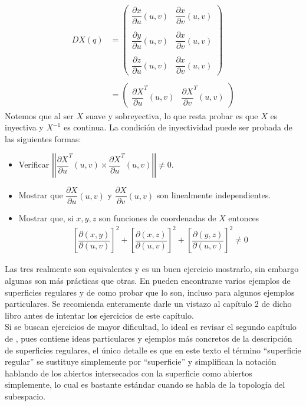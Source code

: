 \documentclass[oneside,11pt]{memoir}
\begin{document}
\begin{align*}
    DX(q)&=
    \begin{pmatrix}
        \dfrac{\partial x}{\partial u}(u,v)&\dfrac{\partial x}{\partial v}(u,v)\\
        \\
        \dfrac{\partial y}{\partial u}(u,v)&\dfrac{\partial x}{\partial v}(u,v)\\
        \\
        \dfrac{\partial z}{\partial u}(u,v)&\dfrac{\partial x}{\partial v}(u,v)
    \end{pmatrix}\\
    \\
    &=
    \begin{pmatrix}
        \dfrac{\partial X}{\partial u}^T(u,v)&\dfrac{\partial X}{\partial v}^T(u,v)
    \end{pmatrix}
\end{align*}
Notemos que al ser $X$ suave y sobreyectiva, lo que resta probar es que $X$ es inyectiva y $X^{-1}$ es continua. La condición de inyectividad puede ser probada de las siguientes formas:
\begin{itemize}
    \item Verificar $\left|\left|\dfrac{\partial X}{\partial u}^T(u,v) \times \dfrac{\partial X}{\partial u}^T(u,v)\right| \right|\neq 0$.
    \item Mostrar que $\dfrac{\partial X}{\partial u}(u,v)$ y $\dfrac{\partial X}{\partial v}(u,v)$ son linealmente independientes.
    \item Mostrar que, si $x,y,z$ son funciones de coordenadas de $X$ entonces
    \begin{align*}
        \left[\dfrac{\partial(x,y)}{\partial(u,v)}\right]^2+
        \left[\dfrac{\partial(x,z)}{\partial(u,v)}\right]^2+
        \left[\dfrac{\partial(y,z)}
        {\partial(u,v)}\right]^2\neq 0
    \end{align*}
\end{itemize}
Las tres realmente son equivalentes y es un buen ejercicio mostrarlo, sin embargo algunas son más prácticas que otras. En \cite{do2016differential} pueden encontrarse varios ejemplos de superficies regulares y de como probar que lo son, incluso para algunos ejemplos particulares. Se recomienda enteramente darle un vistazo al capítulo 2 de dicho libro antes de intentar los ejercicios de este capítulo.\\

Si se buscan ejercicios de mayor dificultad, lo ideal es revisar el segundo capítulo de \cite{montiel2009curves}, pues contiene ideas particulares y ejemplos más concretos de la descripción de superficies regulares, el único detalle es que en este texto el término ``superficie regular'' se sustituye simplemente por ``superficie'' y simplifican la notación hablando de los abiertos intersecados con la superficie como abiertos simplemente, lo cual es bastante estándar cuando se habla de la topología del subespacio.
\end{document}
